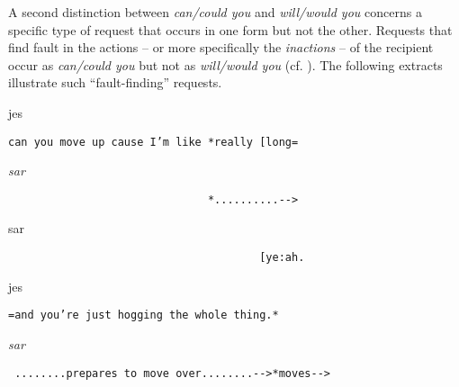 \documentclass[output=paper,nonflat,modfont,draft]{langsci/langscibook}
\begin{document}
A second distinction between \textit{can/could you} and \textit{will/would you} concerns a specific type of request that occurs in one form but not the other. Requests that find fault in the actions -- or more specifically the \textit{inactions} -- of the recipient occur as \textit{can/could you} but not as \textit{will/would you} (cf. \citealt{KentKendrick2016}). The following extracts illustrate such “fault-finding” requests.


\begin{mdframedkendrick}[style=firstfoc]
\begin{transbox}{1}{jes}
\begin{verbatim}
can you move up cause I’m like *really [long=
\end{verbatim}
\end{transbox}
\end{mdframedkendrick}\vspace{-5mm}

\begin{transbox}{2}{\textit{sar}}
\begin{verbatim}
                               *..........-->
\end{verbatim}
\end{transbox}

\begin{transbox}{3}{sar}
\begin{verbatim}
                                       [ye:ah.
\end{verbatim}
\end{transbox}

\begin{transbox}{4}{jes}
\begin{verbatim}
=and you’re just hogging the whole thing.*
\end{verbatim}
\end{transbox}

\begin{mdframedkendrick}[style=secondfoc]
\begin{transbox}{5}{\textit{sar}}
\begin{verbatim}
 ........prepares to move over........-->*moves-->
\end{verbatim}
\end{transbox}
\end{mdframedkendrick}\vspace{-5mm}

\end{document}
